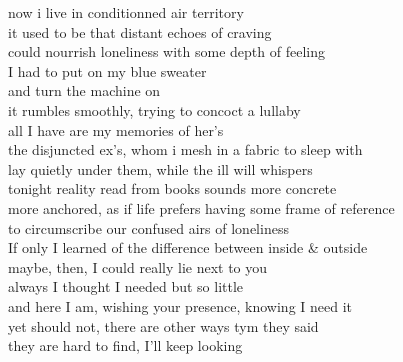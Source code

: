now i live in conditionned air territory\\
it used to be that distant echoes of craving\\
could nourrish loneliness with some depth of feeling\\
I had to put on my blue sweater \\
and turn the machine on\\

it rumbles smoothly, trying to concoct a lullaby\\
all I have are my memories of her's\\
the disjuncted ex's, whom i mesh in a fabric to sleep with\\
lay quietly under them, while the ill will whispers\\
tonight reality read from books sounds more concrete\\
more anchored, as if life prefers having some frame of reference\\
to circumscribe our confused airs of loneliness\\

If only I learned of the difference between inside \& outside\\
maybe, then, I could really lie next to you\\
always I thought I needed but so little\\
and here I am, wishing your presence, knowing I need it\\
yet should not, there are other ways tym they said\\
they are hard to find, I'll keep looking\\
